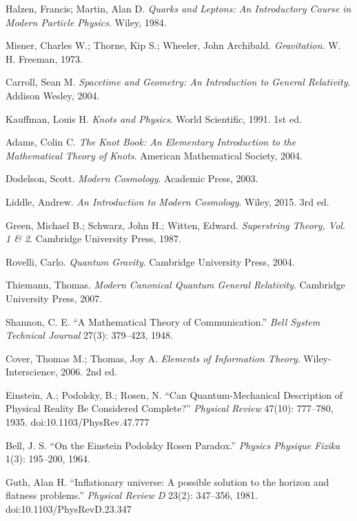 \documentclass[11pt,a4paper]{article}
\begin{document}
\begin{enumerate}[label={[\arabic*]}]
    \item Halzen, Francis; Martin, Alan D. \textit{Quarks and Leptons: An Introductory Course in Modern Particle Physics}. Wiley, 1984.
    \item Misner, Charles W.; Thorne, Kip S.; Wheeler, John Archibald. \textit{Gravitation}. W. H. Freeman, 1973.
    \item Carroll, Sean M. \textit{Spacetime and Geometry: An Introduction to General Relativity}. Addison Wesley, 2004.
    \item Kauffman, Louis H. \textit{Knots and Physics}. World Scientific, 1991. 1st ed.
    \item Adams, Colin C. \textit{The Knot Book: An Elementary Introduction to the Mathematical Theory of Knots}. American Mathematical Society, 2004.
    \item Dodelson, Scott. \textit{Modern Cosmology}. Academic Press, 2003.
    \item Liddle, Andrew. \textit{An Introduction to Modern Cosmology}. Wiley, 2015. 3rd ed.
    \item Green, Michael B.; Schwarz, John H.; Witten, Edward. \textit{Superstring Theory, Vol. 1 \& 2}. Cambridge University Press, 1987.
    \item Rovelli, Carlo. \textit{Quantum Gravity}. Cambridge University Press, 2004.
    \item Thiemann, Thomas. \textit{Modern Canonical Quantum General Relativity}. Cambridge University Press, 2007.
    \item Shannon, C. E. “A Mathematical Theory of Communication.” \textit{Bell System Technical Journal} 27(3): 379–423, 1948.
    \item Cover, Thomas M.; Thomas, Joy A. \textit{Elements of Information Theory}. Wiley-Interscience, 2006. 2nd ed.
    \item Einstein, A.; Podolsky, B.; Rosen, N. “Can Quantum-Mechanical Description of Physical Reality Be Considered Complete?” \textit{Physical Review} 47(10): 777–780, 1935. doi:10.1103/PhysRev.47.777
    \item Bell, J. S. “On the Einstein Podolsky Rosen Paradox.” \textit{Physics Physique Fizika} 1(3): 195–200, 1964.
    \item Guth, Alan H. “Inflationary universe: A possible solution to the horizon and flatness problems.” \textit{Physical Review D} 23(2): 347–356, 1981. doi:10.1103/PhysRevD.23.347
\end{enumerate}
\end{document}
